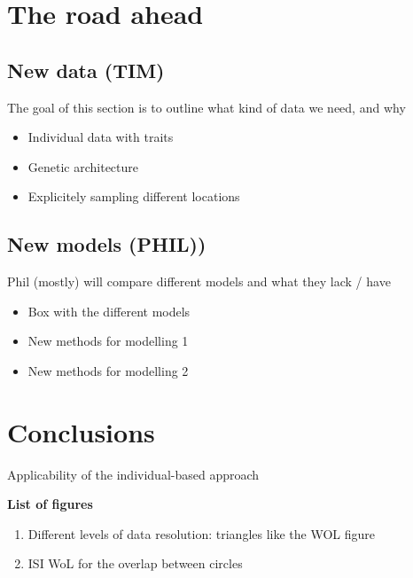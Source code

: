 \documentclass[11pt,oneside]{article}
\begin{document}

\section{The road ahead}

\subsection{New data (TIM)}

The goal of this section is to outline what kind of data we need, and why

\begin{itemize}
	\item Individual data with traits
	\item Genetic architecture
	\item Explicitely sampling different locations
\end{itemize}

\subsection{New models (PHIL))}

Phil (mostly) will compare different models and what they lack / have 

\begin{itemize}
	\item Box with the different models
	\item New methods for modelling 1
	\item New methods for modelling 2
\end{itemize}


\section{Conclusions}

Applicability of the individual-based approach

\printbibliography

\cleardoublepage

\textbf{List of figures}
\begin{enumerate}
	\item Different levels of data resolution: triangles like the WOL figure
	\item ISI WoL for the overlap between circles
\end{enumerate}
\end{document}
